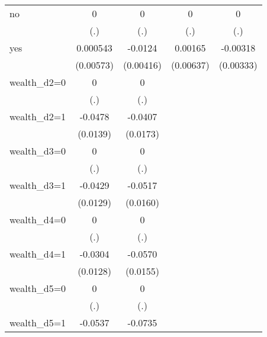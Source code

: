 \begin{table}[htbp]
\begin{tabular}{l*{4}{c}}
\addlinespace
no              &        0         &        0         &        0         &        0         \\
                &      (.)         &      (.)         &      (.)         &      (.)         \\
\addlinespace
yes             & 0.000543         &  -0.0124\sym{***}&  0.00165         & -0.00318         \\
                &(0.00573)         &(0.00416)         &(0.00637)         &(0.00333)         \\
\addlinespace
wealth\_d2=0     &        0         &        0         &                  &                  \\
                &      (.)         &      (.)         &                  &                  \\
\addlinespace
wealth\_d2=1     &  -0.0478\sym{***}&  -0.0407\sym{**} &                  &                  \\
                & (0.0139)         & (0.0173)         &                  &                  \\
\addlinespace
wealth\_d3=0     &        0         &        0         &                  &                  \\
                &      (.)         &      (.)         &                  &                  \\
\addlinespace
wealth\_d3=1     &  -0.0429\sym{***}&  -0.0517\sym{***}&                  &                  \\
                & (0.0129)         & (0.0160)         &                  &                  \\
\addlinespace
wealth\_d4=0     &        0         &        0         &                  &                  \\
                &      (.)         &      (.)         &                  &                  \\
\addlinespace
wealth\_d4=1     &  -0.0304\sym{**} &  -0.0570\sym{***}&                  &                  \\
                & (0.0128)         & (0.0155)         &                  &                  \\
\addlinespace
wealth\_d5=0     &        0         &        0         &                  &                  \\
                &      (.)         &      (.)         &                  &                  \\
\addlinespace
wealth\_d5=1     &  -0.0537\sym{***}&  -0.0735\sym{***}&                  &                  \\

\end{tabular}
\end{table}
